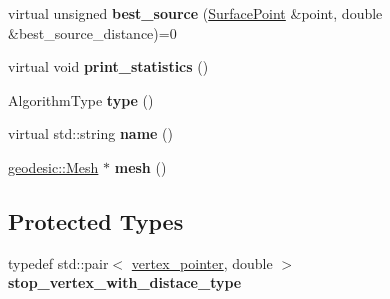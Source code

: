 \begin{DoxyCompactItemize}
\item 
\hypertarget{classgeodesic_1_1_geodesic_algorithm_base_a2cad02f242ef6781d451a539970a547a}{}virtual unsigned {\bfseries best\+\_\+source} (\hyperlink{classgeodesic_1_1_surface_point}{Surface\+Point} \&point, double \&best\+\_\+source\+\_\+distance)=0\label{classgeodesic_1_1_geodesic_algorithm_base_a2cad02f242ef6781d451a539970a547a}

\item 
\hypertarget{classgeodesic_1_1_geodesic_algorithm_base_a44790285937a918a466ed57cc22b327a}{}virtual void {\bfseries print\+\_\+statistics} ()\label{classgeodesic_1_1_geodesic_algorithm_base_a44790285937a918a466ed57cc22b327a}

\item 
\hypertarget{classgeodesic_1_1_geodesic_algorithm_base_a5618d753cb471af1b85c4d1843fd8bc9}{}Algorithm\+Type {\bfseries type} ()\label{classgeodesic_1_1_geodesic_algorithm_base_a5618d753cb471af1b85c4d1843fd8bc9}

\item 
\hypertarget{classgeodesic_1_1_geodesic_algorithm_base_abe7d6bf87ab38b9cbac85c84b17ebf4c}{}virtual std\+::string {\bfseries name} ()\label{classgeodesic_1_1_geodesic_algorithm_base_abe7d6bf87ab38b9cbac85c84b17ebf4c}

\item 
\hypertarget{classgeodesic_1_1_geodesic_algorithm_base_aeaeea45a3e01962834c160a1edbb68ef}{}\hyperlink{classgeodesic_1_1_mesh}{geodesic\+::\+Mesh} $\ast$ {\bfseries mesh} ()\label{classgeodesic_1_1_geodesic_algorithm_base_aeaeea45a3e01962834c160a1edbb68ef}

\end{DoxyCompactItemize}
\subsection*{Protected Types}
\begin{DoxyCompactItemize}
\item 
\hypertarget{classgeodesic_1_1_geodesic_algorithm_base_afc97d6ccbe2c1603793936ec38e6f3a8}{}typedef std\+::pair$<$ \hyperlink{classgeodesic_1_1_vertex}{vertex\+\_\+pointer}, double $>$ {\bfseries stop\+\_\+vertex\+\_\+with\+\_\+distace\+\_\+type}\label{classgeodesic_1_1_geodesic_algorithm_base_afc97d6ccbe2c1603793936ec38e6f3a8}

\end{DoxyCompactItemize}
